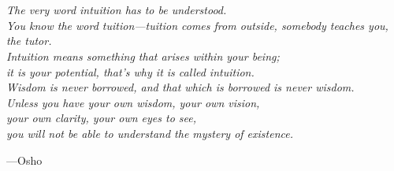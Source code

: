 \thispagestyle{empty}

\begin{center}
	\vspace*{8cm}
	{\fontsize{32}{40} } \\[3mm]
	{\fontsize{32}{40} } \\[4.5mm]
\end{center}

\newpage


\thispagestyle{empty}

\begin{center}
	\vspace*{6cm}
	\textit{The very word intuition has to be understood. \\[5mm]
		You know the word tuition---tuition comes from outside, somebody teaches you, the tutor. \\[5mm]
		Intuition means something that arises within your being; \\[5mm]
		it is your potential, that’s why it is called intuition. \\[5mm]
		Wisdom is never borrowed, and that which is borrowed is never wisdom. \\[5mm]
		Unless you have your own wisdom, your own vision, \\[5mm]
		your own clarity, your own eyes to see, \\[5mm]
		you will not be able to understand the mystery of existence.}
	\begin{flushright}
		---Osho
	\end{flushright}
\end{center}

\newpage



